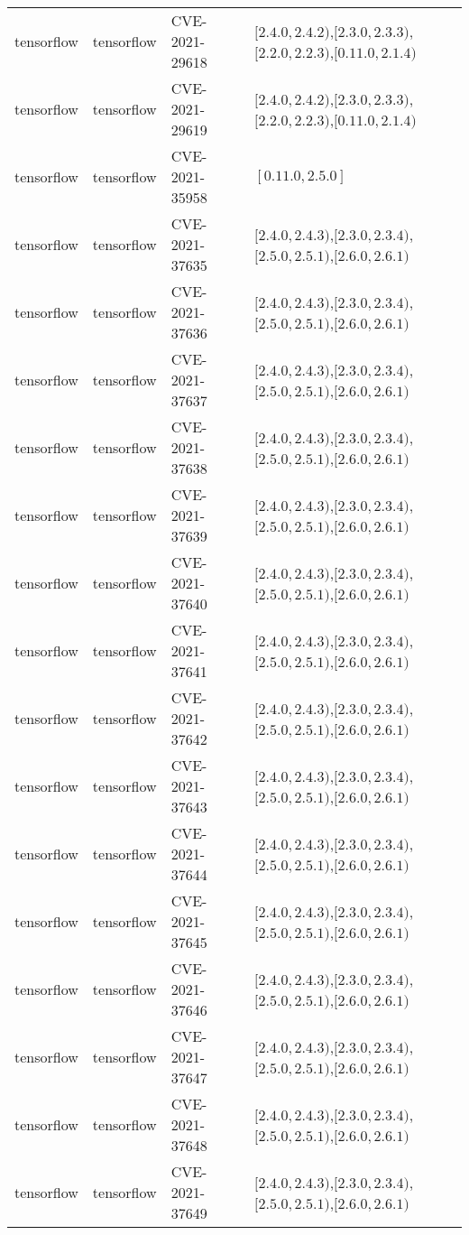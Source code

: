 \begin{tabular}{llll}
tensorflow & tensorflow & CVE-2021-29618 & $[2.4.0,2.4.2)$,$[2.3.0,2.3.3)$,$[2.2.0,2.2.3)$,$[0.11.0,2.1.4)$ \\
tensorflow & tensorflow & CVE-2021-29619 & $[2.4.0,2.4.2)$,$[2.3.0,2.3.3)$,$[2.2.0,2.2.3)$,$[0.11.0,2.1.4)$ \\
tensorflow & tensorflow & CVE-2021-35958 & $[0.11.0,2.5.0]$ \\
tensorflow & tensorflow & CVE-2021-37635 & $[2.4.0,2.4.3)$,$[2.3.0,2.3.4)$,$[2.5.0,2.5.1)$,$[2.6.0,2.6.1)$ \\
tensorflow & tensorflow & CVE-2021-37636 & $[2.4.0,2.4.3)$,$[2.3.0,2.3.4)$,$[2.5.0,2.5.1)$,$[2.6.0,2.6.1)$ \\
tensorflow & tensorflow & CVE-2021-37637 & $[2.4.0,2.4.3)$,$[2.3.0,2.3.4)$,$[2.5.0,2.5.1)$,$[2.6.0,2.6.1)$ \\
tensorflow & tensorflow & CVE-2021-37638 & $[2.4.0,2.4.3)$,$[2.3.0,2.3.4)$,$[2.5.0,2.5.1)$,$[2.6.0,2.6.1)$ \\
tensorflow & tensorflow & CVE-2021-37639 & $[2.4.0,2.4.3)$,$[2.3.0,2.3.4)$,$[2.5.0,2.5.1)$,$[2.6.0,2.6.1)$ \\
tensorflow & tensorflow & CVE-2021-37640 & $[2.4.0,2.4.3)$,$[2.3.0,2.3.4)$,$[2.5.0,2.5.1)$,$[2.6.0,2.6.1)$ \\
tensorflow & tensorflow & CVE-2021-37641 & $[2.4.0,2.4.3)$,$[2.3.0,2.3.4)$,$[2.5.0,2.5.1)$,$[2.6.0,2.6.1)$ \\
tensorflow & tensorflow & CVE-2021-37642 & $[2.4.0,2.4.3)$,$[2.3.0,2.3.4)$,$[2.5.0,2.5.1)$,$[2.6.0,2.6.1)$ \\
tensorflow & tensorflow & CVE-2021-37643 & $[2.4.0,2.4.3)$,$[2.3.0,2.3.4)$,$[2.5.0,2.5.1)$,$[2.6.0,2.6.1)$ \\
tensorflow & tensorflow & CVE-2021-37644 & $[2.4.0,2.4.3)$,$[2.3.0,2.3.4)$,$[2.5.0,2.5.1)$,$[2.6.0,2.6.1)$ \\
tensorflow & tensorflow & CVE-2021-37645 & $[2.4.0,2.4.3)$,$[2.3.0,2.3.4)$,$[2.5.0,2.5.1)$,$[2.6.0,2.6.1)$ \\
tensorflow & tensorflow & CVE-2021-37646 & $[2.4.0,2.4.3)$,$[2.3.0,2.3.4)$,$[2.5.0,2.5.1)$,$[2.6.0,2.6.1)$ \\
tensorflow & tensorflow & CVE-2021-37647 & $[2.4.0,2.4.3)$,$[2.3.0,2.3.4)$,$[2.5.0,2.5.1)$,$[2.6.0,2.6.1)$ \\
tensorflow & tensorflow & CVE-2021-37648 & $[2.4.0,2.4.3)$,$[2.3.0,2.3.4)$,$[2.5.0,2.5.1)$,$[2.6.0,2.6.1)$ \\
tensorflow & tensorflow & CVE-2021-37649 & $[2.4.0,2.4.3)$,$[2.3.0,2.3.4)$,$[2.5.0,2.5.1)$,$[2.6.0,2.6.1)$ \\

\end{tabular}
